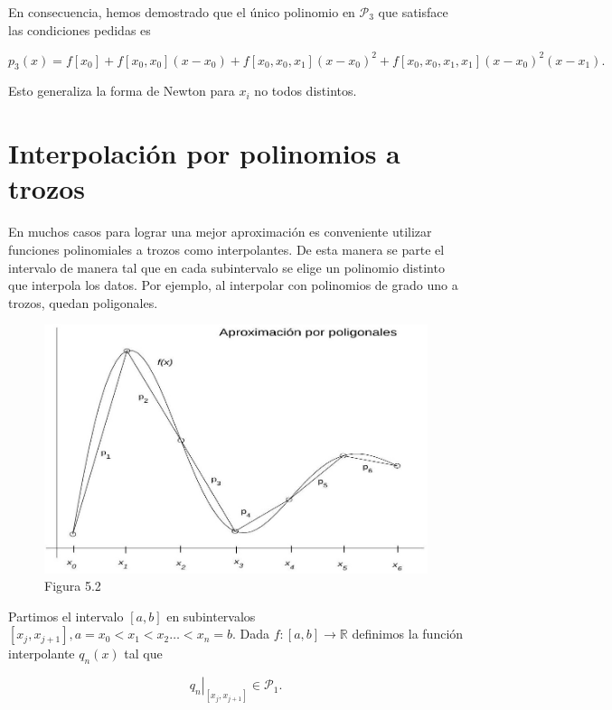 \documentclass[10pt]{book}
\begin{document}
En consecuencia, hemos demostrado que el único polinomio en $\mathcal{P}_{3}$ que satisface las condiciones pedidas es

$$
p_{3}(x)=f\left[x_{0}\right]+f\left[x_{0}, x_{0}\right]\left(x-x_{0}\right)+f\left[x_{0}, x_{0}, x_{1}\right]\left(x-x_{0}\right)^{2}+f\left[x_{0}, x_{0}, x_{1}, x_{1}\right]\left(x-x_{0}\right)^{2}\left(x-x_{1}\right) .
$$

Esto generaliza la forma de Newton para $x_{i}$ no todos distintos.

\section{Interpolación por polinomios a trozos}
En muchos casos para lograr una mejor aproximación es conveniente utilizar funciones polinomiales a trozos como interpolantes. De esta manera se parte el intervalo de manera tal que en cada subintervalo se elige un polinomio distinto que interpola los datos. Por ejemplo, al interpolar con polinomios de grado uno a trozos, quedan poligonales.

\begin{figure}[h]
\begin{center}
  \includegraphics[width=\textwidth]{2025_09_05_3888c9ac96bd653d96b4g-110}
\captionsetup{labelformat=empty}
\caption{Figura 5.2}
\end{center}
\end{figure}

Partimos el intervalo $[a, b]$ en subintervalos $\left[x_{j}, x_{j+1}\right], a=x_{0}<x_{1}<x_{2} \ldots<x_{n}=b$. Dada $f:[a, b] \rightarrow \mathbb{R}$ definimos la función interpolante $q_{n}(x)$ tal que

$$
\left.q_{n}\right|_{\left[x_{j}, x_{j+1}\right]} \in \mathcal{P}_{1} .
$$
\end{document}
